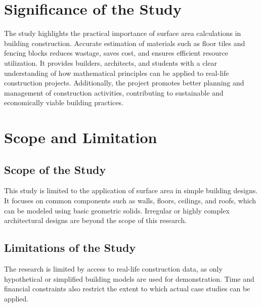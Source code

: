 \documentclass[12pt,a4paper,openany,titlepage,reqno, final]{report}
\theoremstyle{definition}
\begin{document}
\section{Significance of the Study}
The study highlights the practical importance of surface area calculations in building construction. Accurate estimation of materials such as floor tiles and fencing blocks reduces wastage, saves cost, and ensures efficient resource utilization. It provides builders, architects, and students with a clear understanding of how mathematical principles can be applied to real-life construction projects. Additionally, the project promotes better planning and management of construction activities, contributing to sustainable and economically viable building practices.


\section{Scope and Limitation}
\subsection*{Scope of the Study}
This study is limited to the application of surface area in simple building designs. It focuses on common components such as walls, floors, ceilings, and roofs, which can be modeled using basic geometric solids. Irregular or highly complex architectural designs are beyond the scope of this research.

\subsection*{Limitations of the Study}
The research is limited by access to real-life construction data, as only hypothetical or simplified building models are used for demonstration. Time and financial constraints also restrict the extent to which actual case studies can be applied.
\end{document}
